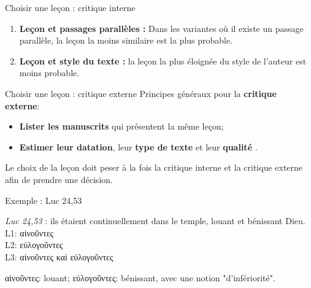\documentclass[11pt]{beamer}
\begin{document}
\begin{frame}{Choisir une leçon : critique interne}

\begin{enumerate}
    \item \textbf{Leçon et passages parallèles :} Dans les variantes où il existe un passage parallèle, la leçon la moins similaire est la plus probable.
    \item \textbf{Leçon et style du texte :} la leçon la plus éloignée du style de l'auteur est moins probable.
\end{enumerate}

\end{frame}


\begin{frame}{Choisir une leçon : critique externe}
    Principes généraux pour la \textbf{critique externe}:
    \begin{itemize}
        \item \textbf{Lister les manuscrits} qui présentent la même leçon;
        \item \textbf{Estimer leur datation}, leur \textbf{type de texte} et leur \og \textbf{qualité} \fg.
    \end{itemize}

    \begin{alertblock}{}
       Le choix de la leçon doit peser à la fois la critique interne et la critique externe afin de prendre une décision.
    \end{alertblock}
\end{frame}

\begin{frame}{Exemple : Luc 24,53}
    \begin{exampleblock}{}
   \textit{Luc 24,53} : ils étaient continuellement dans le temple, louant et bénissant Dieu.\\
   
   L1: \textgreek{αἰνοῦντες}\\
   L2: \textgreek{εὐλογοῦντες} \\
   L3: \textgreek{αἰνοῦντες καὶ εὐλογοῦντες}\\
    \end{exampleblock}
    \textgreek{αἰνοῦντες}: louant;
    \textgreek{εὐλογοῦντες}: bénissant, avec une notion "d'infériorité".
\end{frame}
\end{document}
